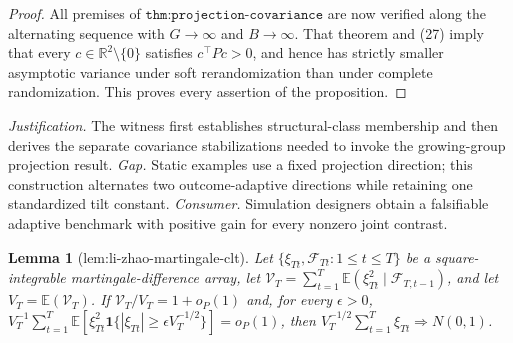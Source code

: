 \documentclass{article}
\newtheorem{lemma}{Lemma}
\begin{document}
\begin{proof}
All premises of \(\texttt{thm:projection-covariance}\) are now verified along the alternating sequence with \(G\to\infty\) and \(B\to\infty\).  That theorem and (27) imply that every \(c\in\mathbb R^2\setminus\{0\}\) satisfies \(c^\top Pc>0\), and hence has strictly smaller asymptotic variance under soft rerandomization than under complete randomization.  This proves every assertion of the proposition.
\end{proof}
\par\smallskip\noindent \textit{Justification.} The witness first establishes structural-class membership and then derives the separate covariance stabilizations needed to invoke the growing-group projection result. \textit{Gap.} Static examples use a fixed projection direction; this construction alternates two outcome-adaptive directions while retaining one standardized tilt constant. \textit{Consumer.} Simulation designers obtain a falsifiable adaptive benchmark with positive gain for every nonzero joint contrast.

\begin{lemma}[lem:li-zhao-martingale-clt]\label{lem:li-zhao-martingale-clt}
Let \(\{\xi_{Tt},\mathcal F_{Tt}:1\leq t\leq T\}\) be a square-integrable martingale-difference array, let \(\mathcal V_T=\sum_{t=1}^T\mathbb E(\xi_{Tt}^2\mid\mathcal F_{T,t-1})\), and let \(V_T=\mathbb E(\mathcal V_T)\). If \(\mathcal V_T/V_T=1+o_P(1)\) and, for every \(\epsilon>0\), \(V_T^{-1}\sum_{t=1}^T\mathbb E[\xi_{Tt}^2\mathbf1\{|\xi_{Tt}|\geq\epsilon V_T^{-1/2}\}]=o_P(1)\), then \(V_T^{-1/2}\sum_{t=1}^T\xi_{Tt}\Rightarrow N(0,1)\).
\end{lemma}
\end{document}

